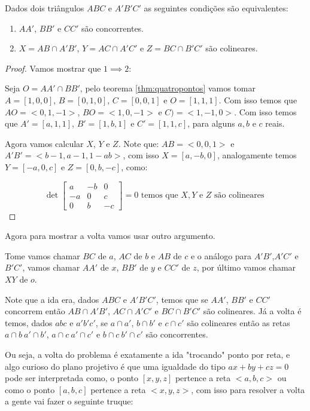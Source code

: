 \begin{thm}
Dados dois triângulos $ABC$ e $A'B'C'$ as seguintes condições são equivalentes:
\begin{enumerate}
    \item $AA'$, $BB'$ e $CC'$ são concorrentes.
    \item $X = AB \cap A'B'$, $Y = AC\cap A'C'$ e $Z = BC \cap B'C'$ são colineares.
\end{enumerate}
\end{thm}

\begin{proof}
Vamos mostrar que $1 \implies 2$:

Seja $O = AA' \cap BB'$, pelo teorema \ref{thm:quatropontos} vamos tomar $A = [1, 0, 0]$, $B = [0, 1, 0]$, $C = [0, 0, 1]$ e $O = [1, 1, 1]$. Com isso temos que $AO = < 0, 1, -1>$, $BO = < 1, 0, -1>$ e $C) = < 1, -1, 0>$. Com isso temos que $A' = [a,1,1]$, $B' = [1,b,1]$ e $C'= [1,1,c]$, para alguns $a,b$ e $c$ reais. 

Agora vamos calcular $X$, $Y$ e $Z$. Note que: $AB = <0,0,1>$ e $A'B' = <b-1,a-1,1-ab>$, com isso $X = [a,-b,0]$, analogamente temos $Y = [-a,0,c]$ e $Z = [0,b,-c]$, como:

\[\det \begin{bmatrix} a & -b & 0 \\ -a & 0 & c \\ 0 & b & -c \end{bmatrix} = 0 \text{ temos que } X,Y \text{ e } Z \text{ são colineares } \]
\end{proof}

Agora para mostrar a volta vamos usar outro argumento.

Tome vamos chamar $BC$ de $a$, $AC$ de $b$ e $AB$ de $c$ e o análogo para $A'B'$,$A'C'$ e $B'C'$, vamos chamar $AA'$ de $x$, $BB'$ de $y$ e $CC'$ de $z$, por último vamos chamar $XY$ de $o$.

Note que a ida era, dados $ABC$ e $A'B'C'$, temos que se $AA'$, $BB'$ e $CC'$ concorrem então $AB \cap A'B'$, $AC\cap A'C'$ e $ BC \cap B'C'$ são colineares. Já a volta é temos, dados $abc$ e $a'b'c'$, se $a \cap a'$, $b \cap b'$ e $c\cap c'$ são colineares então as retas $a\cap b \ a'\cap b'$, $a\cap c \ a' \cap c'$ e $ b\cap c \ b'\cap c'$ são concorrentes.

Ou seja, a volta do problema é exatamente a ida "trocando" ponto por reta, e algo curioso do plano projetivo é que uma igualdade do tipo $ax+by+cz=0$ pode ser interpretada como, o ponto $[x,y,z]$ pertence a reta $<a,b,c>$ ou como o ponto $[a,b,c]$ pertence a reta $<x,y,z>$, com isso para resolver a volta a gente vai fazer o seguinte truque:

